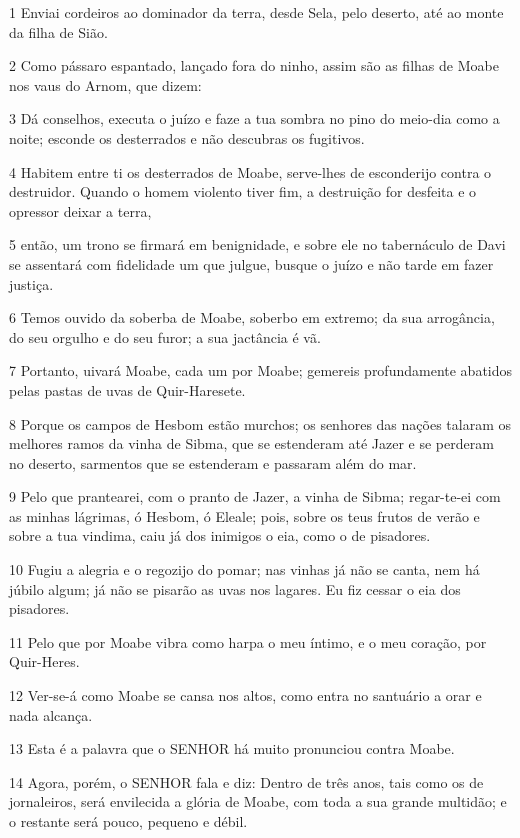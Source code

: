 \par 1 Enviai cordeiros ao dominador da terra, desde Sela, pelo deserto, até ao monte da filha de Sião.
\par 2 Como pássaro espantado, lançado fora do ninho, assim são as filhas de Moabe nos vaus do Arnom, que dizem:
\par 3 Dá conselhos, executa o juízo e faze a tua sombra no pino do meio-dia como a noite; esconde os desterrados e não descubras os fugitivos.
\par 4 Habitem entre ti os desterrados de Moabe, serve-lhes de esconderijo contra o destruidor. Quando o homem violento tiver fim, a destruição for desfeita e o opressor deixar a terra,
\par 5 então, um trono se firmará em benignidade, e sobre ele no tabernáculo de Davi se assentará com fidelidade um que julgue, busque o juízo e não tarde em fazer justiça.
\par 6 Temos ouvido da soberba de Moabe, soberbo em extremo; da sua arrogância, do seu orgulho e do seu furor; a sua jactância é vã.
\par 7 Portanto, uivará Moabe, cada um por Moabe; gemereis profundamente abatidos pelas pastas de uvas de Quir-Haresete.
\par 8 Porque os campos de Hesbom estão murchos; os senhores das nações talaram os melhores ramos da vinha de Sibma, que se estenderam até Jazer e se perderam no deserto, sarmentos que se estenderam e passaram além do mar.
\par 9 Pelo que prantearei, com o pranto de Jazer, a vinha de Sibma; regar-te-ei com as minhas lágrimas, ó Hesbom, ó Eleale; pois, sobre os teus frutos de verão e sobre a tua vindima, caiu já dos inimigos o eia, como o de pisadores.
\par 10 Fugiu a alegria e o regozijo do pomar; nas vinhas já não se canta, nem há júbilo algum; já não se pisarão as uvas nos lagares. Eu fiz cessar o eia dos pisadores.
\par 11 Pelo que por Moabe vibra como harpa o meu íntimo, e o meu coração, por Quir-Heres.
\par 12 Ver-se-á como Moabe se cansa nos altos, como entra no santuário a orar e nada alcança.
\par 13 Esta é a palavra que o SENHOR há muito pronunciou contra Moabe.
\par 14 Agora, porém, o SENHOR fala e diz: Dentro de três anos, tais como os de jornaleiros, será envilecida a glória de Moabe, com toda a sua grande multidão; e o restante será pouco, pequeno e débil.

